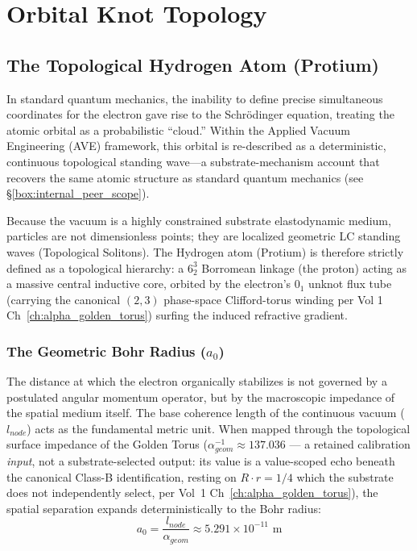 \section{Orbital Knot Topology}


\subsection{The Topological Hydrogen Atom (Protium)}

In standard quantum mechanics, the inability to define precise simultaneous coordinates for the electron gave rise to the Schrödinger equation, treating the atomic orbital as a probabilistic ``cloud.'' Within the Applied Vacuum Engineering (AVE) framework, this orbital is re-described as a deterministic, continuous topological standing wave---a substrate-mechanism account that recovers the same atomic structure as standard quantum mechanics (see \S\ref{box:internal_peer_scope}).

Because the vacuum is a highly constrained substrate elastodynamic medium, particles are not dimensionless points; they are localized geometric LC standing waves (Topological Solitons). The Hydrogen atom (Protium) is therefore strictly defined as a topological hierarchy: a $6^3_2$ Borromean linkage (the proton) acting as a massive central inductive core, orbited by the electron's $0_1$ unknot flux tube (carrying the canonical $(2,3)$ phase-space Clifford-torus winding per Vol 1 Ch~\ref{ch:alpha_golden_torus}) surfing the induced refractive gradient.

\subsubsection{The Geometric Bohr Radius ($a_0$)}
The distance at which the electron organically stabilizes is not governed by a postulated angular momentum operator, but by the macroscopic impedance of the spatial medium itself. The base coherence length of the continuous vacuum ($l_{node}$) acts as the fundamental metric unit. When mapped through the topological surface impedance of the Golden Torus ($\alpha_{geom}^{-1} \approx 137.036$ --- a retained calibration \emph{input}, not a substrate-selected output: its value is a value-scoped echo beneath the canonical Class-B identification, resting on $R\cdot r = 1/4$ which the substrate does not independently select, per Vol~1 Ch~\ref{ch:alpha_golden_torus}), the spatial separation expands deterministically to the Bohr radius:
\begin{equation}
a_0 = \frac{l_{node}}{\alpha_{geom}} \approx 5.291 \times 10^{-11} \text{ m}
\end{equation}

